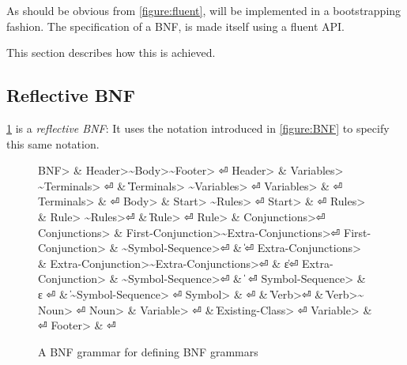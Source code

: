 As should be obvious from \cref{figure:fluent}, \Fajita will be implemented
in a bootstrapping fashion.
The specification of a BNF, is made itself using a fluent API.

This section describes how this is achieved.

\subsection{Reflective BNF}
\cref{figure:BNF:BNF} is a \emph{reflective BNF}:
It uses the notation introduced in \cref{figure:BNF}
to specify this same notation.

\begin{figure}
  \begin{Grammar}
    \begin{aligned}
      \<BNF>                & \Derives \<Header>\~\<Body>\~\<Footer> \hfill⏎
      \<Header>             & \Derives \<Variables> \~\<Terminals> \hfill⏎
      {}                    & \| \<Terminals> \~\<Variables> \hfill⏎
      \<Variables>          & \Derives {}\hfill⏎
      \<Terminals>          & \Derives {}\hfill⏎
      \<Body>               & \Derives \<Start> \~\<Rules> \hfill⏎
      \<Start>              & \Derives {} \hfill⏎
      \<Rules>              & \Derives \<Rule> \~\<Rules>\hfill⏎
      {}                    & \| \<Rule> \hfill⏎
      \<Rule>               & \Derives {} \<Conjunctions>\hfill⏎
      \<Conjunctions>       & \Derives \<First-Conjunction>\~\<Extra-Conjunctions>\hfill⏎
      \<First-Conjunction>  & \Derives {}\~\<Symbol-Sequence>\hfill⏎
      {}                    & \| \hfill⏎
      \<Extra-Conjunctions> & \Derives \<Extra-Conjunction>\~\<Extra-Conjunctions>\hfill⏎
      {}                    & \| ε\hfill⏎
      \<Extra-Conjunction>  & \Derives {}\~\<Symbol-Sequence>\hfill⏎
      {}                    & \|  \hfill⏎
      \<Symbol-Sequence>    & \Derives ε \hfill⏎
      {}                    & \| \~\<Symbol-Sequence> \hfill⏎
      \<Symbol>             & \Derives {} \hfill⏎
      {}                    & \| \<Verb>\hfill⏎
      {}                    & \| \<Verb>\~\cc{,} \<Noun> \hfill⏎
      \<Noun>               & \Derives \<Variable> \hfill⏎
      {}                    & \| \<Existing-Class> \hfill⏎
      \<Variable>           & \Derives {} \hfill⏎
      \<Footer>             & \Derives {}\hfill⏎
    \end{aligned}
  \end{Grammar}
  \caption{A BNF grammar for defining BNF grammars}
  \label{figure:BNF:BNF}
\end{figure}
\begin{comment}
Note that this specification can only be approximate;
the figure uses verbs as replacement to indentation,
and special symbols such as~$|$,~$::-$ and~$ε$.
\end{comment}

